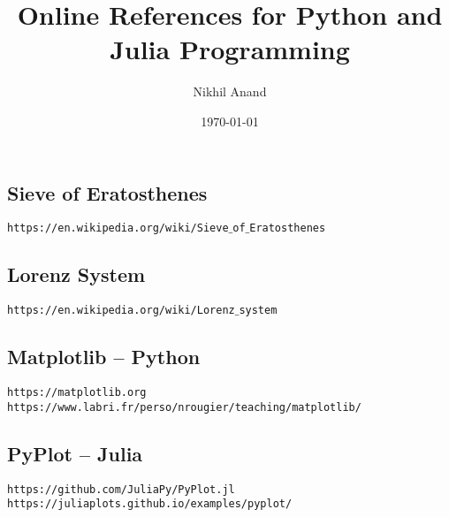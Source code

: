 \documentclass[11pt]{article}
\author{Nikhil Anand}
\date{\today}
\title{Online References for Python and Julia Programming}
\begin{document}
\maketitle
\subsection*{Sieve of Eratosthenes}
\texttt{https://en.wikipedia.org/wiki/Sieve$\_$of$\_$Eratosthenes}

\subsection*{Lorenz System}
\texttt{https://en.wikipedia.org/wiki/Lorenz$\_$system}

\subsection*{Matplotlib -- Python}
\texttt{https://matplotlib.org}\\
\texttt{https://www.labri.fr/perso/nrougier/teaching/matplotlib/}

\subsection*{PyPlot -- Julia}
\texttt{https://github.com/JuliaPy/PyPlot.jl}\\
\texttt{https://juliaplots.github.io/examples/pyplot/}
\end{document}
